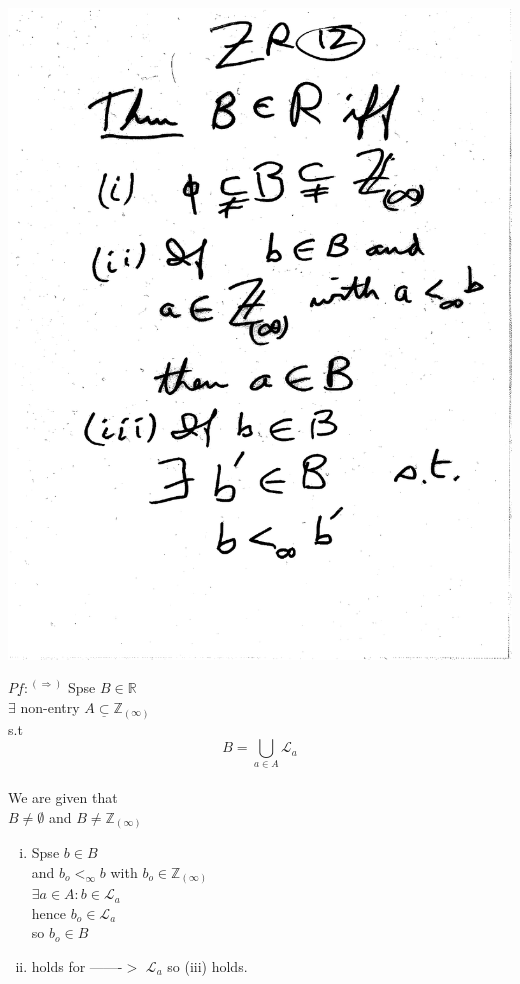 \documentclass[10pt,a4paper]{article}
\begin{document}
{{\begin{enumerate}[(i)]
\includegraphics[scale=.5]{Pages/ZR_12}
\end{enumerate}

\newpage

$\underline{Pf:}^{(\Rightarrow)}$ Spse $B \in \mathbb{R}$
\\ $\exists$ non-entry $A \underline{\subset} \mathbb{Z}_{(\infty)}$
\\ s.t $$B=\bigcup_{a \in A} \mathcal{L}_a$$
\\ We are given that
\\ $B \neq \emptyset$ and $B \neq \mathbb{Z}_{(\infty)}$ 

\begin{enumerate}[(ii)] 
\item Spse $b \in B$
\\ and $b_o <_\infty b$ with $b_o \in \mathbb{Z}_{(\infty)}$
\\ $\exists a \in A: b \in \mathcal{L}_a$
\\hence $b_o \in \mathcal{L}_a$
\\ so $b_o \in B$
\item holds for -------$>$ $\mathcal{L}_a$ so (iii) holds. 


\end{enumerate}}}
\end{document}
